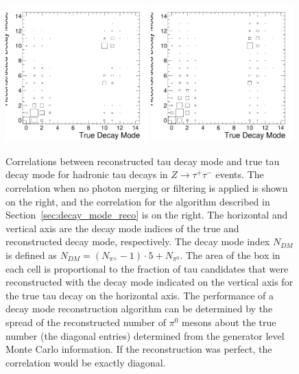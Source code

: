 \begin{figure}[thbp]
  \centering
   \includegraphics*[width=0.49\textwidth]{tanc_chapter/figures/decayModeMergerAndFilter/dmResolutionStandard.pdf}
   \includegraphics*[width=0.49\textwidth]{tanc_chapter/figures/decayModeMergerAndFilter/dmResolutionNoNothing.pdf}
   \caption[Tau decay mode reconstruction performance]{Correlations between
   reconstructed tau decay mode and true tau decay mode for hadronic tau decays
   in $Z \rightarrow \tau^{+}\tau^{-}$ events.  The correlation when no photon
   merging or filtering is applied is shown on the right, and the correlation
   for the algorithm described in Section~\ref{sec:decay_mode_reco} is on the
   right.  The horizontal and vertical axis are the decay mode indices of the
   true and reconstructed decay mode, respectively.  The decay mode index
   $N_{DM}$ is defined as $N_{DM} = (N_{\pi^{\pm}} - 1)\cdot5 + N_{\pi^0}$.  The
   area of the box in each cell is proportional to the fraction of
   tau candidates that were reconstructed with the decay mode indicated on the
   vertical axis for the true tau decay on the horizontal axis.  The performance
   of a decay mode reconstruction algorithm can be determined by the spread of
   the reconstructed number of $\pi^0$ mesons about the true number (the
   diagonal entries) determined from the generator level Monte Carlo
   information.  If the reconstruction was perfect, the correlation would be
   exactly diagonal.
   } \label{fig:dmResolution}
\end{figure}

